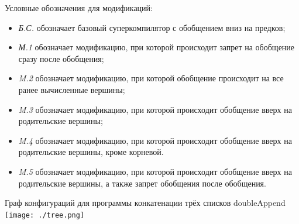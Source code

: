 \documentclass[xcolor=table]{beamer}
\begin{document}
\begin{frame}
Условные обозначения для модификаций:
\begin{itemize}
\item {\it Б.С.} обозначает базовый суперкомпилятор с обобщением вниз на предков;
\item {\it М.1 } обозначает модификацию, при которой происходит запрет на обобщение сразу после обобщения;
\item {\it M.2 } обозначает модификацию, при которой обобщение происходит на все ранее вычисленные вершины;
\item {\it M.3 } обозначает модификацию, при которой происходит обобщение вверх на родительские вершины;
\item {\it M.4 } обозначает модификацию, при которой происходит обобщение вверх на родительские вершины, кроме корневой.
\item {\it M.5 } обозначает модификацию, при которой происходит обобщение вверх на родительские вершины, а также запрет обобщения после обобщения.
\end{itemize}
\end{frame}

\begin{frame}{Граф конфигураций для программы конкатенации трёх списков doubleAppend}
\center
\texttt{[image: ./tree.png]}
\end{frame}
\end{document}
